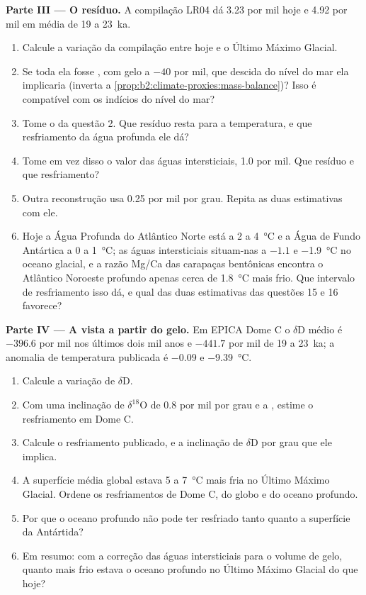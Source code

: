\begin{problem}
\medskip\noindent\textbf{Parte III --- O resíduo.}
A compilação LR04 dá \num{3.23} por mil hoje e \num{4.92} por mil em média de 19 a
\qty{23}{ka}.
\begin{enumerate}[resume]
  \item Calcule a variação da compilação entre hoje e o Último Máximo Glacial.
  \item Se toda ela fosse , com gelo a $-40$ por mil, que descida do nível do mar ela
        implicaria (inverta a \cref{prop:b2:climate-proxies:mass-balance})? Isso é compatível com os
        indícios do nível do mar?
  \item Tome o  da questão 2. Que resíduo resta para a temperatura, e
        que resfriamento da água profunda ele dá?
  \item Tome em vez disso o valor das águas intersticiais, \num{1.0} por mil. Que resíduo e que resfriamento?
  \item Outra reconstrução usa \num{0.25} por mil por grau. Repita as duas estimativas com ele.
  \item Hoje a Água Profunda do Atlântico Norte está a 2 a \qty{4}{\celsius} e a Água de Fundo
        Antártica a 0 a \qty{1}{\celsius}; as águas intersticiais situam-nas a $-1.1$ e \qty{-1.9}{\celsius}
        no oceano glacial, e a razão Mg/Ca das carapaças bentônicas encontra o Atlântico Noroeste profundo
        apenas cerca de \qty{1.8}{\celsius} mais frio. Que intervalo de resfriamento isso dá, e qual das
        duas estimativas das questões 15 e 16 favorece?
\end{enumerate}

\medskip\noindent\textbf{Parte IV --- A vista a partir do gelo.}
Em EPICA Dome C o $\delta$D médio é $-396.6$ por mil nos últimos dois mil anos e
$-441.7$ por mil de 19 a \qty{23}{ka}; a anomalia de temperatura publicada é $-0.09$ e
\qty{-9.39}{\celsius}.
\begin{enumerate}[resume]
  \item Calcule a variação de $\delta$D.
  \item Com uma inclinação de $\delta^{18}$O de \num{0.8} por mil por grau e a ,
        estime o resfriamento em Dome C.
  \item Calcule o resfriamento publicado, e a inclinação de $\delta$D por grau que ele implica.
  \item A superfície média global estava 5 a \qty{7}{\celsius} mais fria no Último Máximo Glacial.
        Ordene os resfriamentos de Dome C, do globo e do oceano profundo.
  \item Por que o oceano profundo não pode ter resfriado tanto quanto a superfície da Antártida?
  \item Em resumo: com a correção das águas intersticiais para o volume de gelo, quanto mais frio estava o oceano
        profundo no Último Máximo Glacial do que hoje?
\end{enumerate}
\end{problem}
